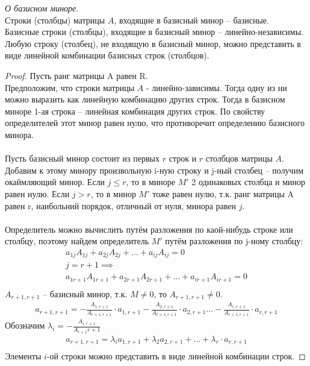 \begin{theorem}
  \textit{О базисном миноре}. \\ 
  Строки (столбцы) матрицы $A$, входящие в базисный минор -- базисные. \\
  Базисные строки (столбцы), входящие в базисный минор -- линейно-независимы. \\
  Любую строку (столбец), не входящую в базисный минор, можно представить в виде линейной комбинации базисных строк (столбцов).
\end{theorem}
\begin{proof}
  Пусть ранг матрицы A равен R. \\
  Предположим, что строки матрицы $A$ - линейно-зависимы. 
  Тогда одну из ни можно выразить как линейную комбинацию других строк. 
  Тогда в базисном миноре 1-ая строка -- линейная комбинация других строк. 
  По свойству определителей этот минор равен нулю, что противоречит определению базисного минора. \\
  \\
  Пусть базисный минор состоит из первых $r$ строк и $r$ столбцов матрицы $A$. 
  Добавим к этому минору произвольную i-ную строку и j-ный столбец -- получим окаймляющий минор. 
  Если $j \le r$, то в миноре $M'$ 2 одинаковых столбца и минор равен нулю.
  Если $j > r$, то в минор  $M'$ тоже равен нулю, т.к. ранг матрицы A равен r, наибольний порядок, отличный от нуля, минора равен $j$. \\
  \\
  Определитель можно вычислить путём разложения по каой-нибудь строке или столбцу, поэтому найдем определитель $M'$ путём разложения по j-ному столбцу:
   \begin{gather*}
     a_{1j} A_{1j} + a_{2j} A_{2j} + \ldots + a_{ij} A_{ij} = 0 \\
     j = r + 1 \implies \\
     a_{1r+1} A_{1r+1} + a_{2r+1} A_{2r+1} + \ldots + a_{ir+1} A_{ir+1} = 0 \\
  \end{gather*}
  $A_{r+1,r+1}$ -- базисный минор, т.к. $M \neq 0$, то $A_{r+1,r+1} \neq 0$.
  \begin{gather*}
    a_{r+1,r+1} =
    - \frac{A_{1,r+1}}{A_{r+1,r+1}} \cdot  a_{1,r+1}
    - \frac{A_{2,r+1}}{A_{r+1,r+1}} \cdot  a_{2,r+1}
    \ldots
    - \frac{A_{r,r+1}}{A_{r+1,r+1}} \cdot  a_{r,r+1}
  \end{gather*}
  Обозначим $\lambda_i = -\frac{A_{i,r+1}}{A_{r+1}{r+1}}$
  \begin{gather*}
    a_{r+1,r+1} = \lambda_i a_{1,r+1} + \lambda_2 a_{2,r+1} + \ldots + \lambda_r \cdot a_{r,r+1} \\
  \end{gather*}
  Элементы $i$-ой строки можно представить в виде линейной комбинации строк.
\end{proof}

